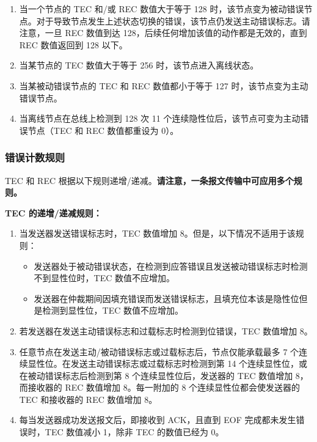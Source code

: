 \documentclass[main\_\_CN.tex]{subfiles}
\begin{document}
\begin{enumerate}
    \item 当一个节点的 TEC 和/或 REC 数值大于等于 128 时，该节点变为被动错误节点。对于导致节点发生上述状态切换的错误，该节点仍发送主动错误标志。请注意，一旦 REC 数值到达 128，后续任何增加该值的动作都是无效的，直到 REC 数值返回到 128 以下。
    \item 当某节点的 TEC 数值大于等于 256 时，该节点进入离线状态。
    \item 当某被动错误节点的 TEC 和 REC 数值都小于等于 127 时，该节点变为主动错误节点。
    \item 当离线节点在总线上检测到 128 次 11 个连续隐性位后，该节点可变为主动错误节点（TEC 和 REC 数值都重设为 0）。
\end{enumerate}

\subsubsection{错误计数规则}

TEC 和 REC 根据以下规则递增/递减。\textbf{请注意，一条报文传输中可应用多个规则。}


\textbf{TEC 的递增/递减规则：}
\begin{enumerate}
    \item 当发送器发送错误标志时，TEC 数值增加 8。但是，以下情况不适用于该规则：
    \begin{itemize}
        \item 发送器处于被动错误状态，在检测到应答错误且发送被动错误标志时检测不到显性位时，TEC 数值不应增加。
        \item 发送器在仲裁期间因填充错误而发送错误标志，且填充位本该是隐性位但是检测到显性位，TEC 数值不应增加。
    \end{itemize}
    \item 若发送器在发送主动错误标志和过载标志时检测到位错误，TEC 数值增加 8。
    \item 任意节点在发送主动/被动错误标志或过载标志后，节点仅能承载最多 7 个连续显性位。在发送主动错误标志或过载标志时检测到第 14 个连续显性位，或在被动错误标志后检测到第 8 个连续显性位后，发送器的 TEC 数值增加 8，而接收器的 REC 数值增加 8。每一附加的 8 个连续显性位都会使发送器的 TEC 和接收器的 REC 数值增加 8。
    \item 每当发送器成功发送报文后，即接收到 ACK，且直到 EOF 完成都未发生错误时，TEC 数值减小 1，除非 TEC 的数值已经为 0。
\end{enumerate}
\end{document}
